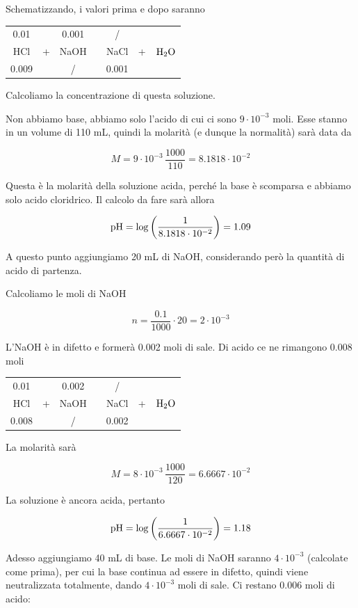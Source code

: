 Schematizzando, i valori prima e dopo saranno

\begin{center}
    \begin{tabular}{ccccccc}
        0.01 &  & 0.001 & & / & &\\
        HCl & + & NaOH & \ce{->} & NaCl & + & $\rm H_2O$\\
        0.009 &  &  / & & 0.001 & &\\
    \end{tabular}
\end{center}

Calcoliamo la concentrazione di questa soluzione.

Non abbiamo base, abbiamo solo l'acido di cui ci sono $9 \cdot 10^{-3}$ moli. Esse stanno in un volume di 110 mL, quindi la molarità (e dunque la normalità) sarà data da

$$M=9 \cdot 10^{-3} \, \frac{1000}{110}=8.1818 \cdot 10^{-2}$$

Questa è la molarità della soluzione acida, perché la base è scomparsa e abbiamo solo acido cloridrico. Il calcolo da fare sarà allora

$$\rm pH=\log\left( \frac{1}{8.1818 \cdot 10^{-2}} \right)=1.09$$

A questo punto aggiungiamo 20 mL di NaOH, considerando però la quantità di acido di partenza.

Calcoliamo le moli di NaOH

$$n=\frac{0.1}{1000}\cdot 20=2 \cdot 10^{-3}$$

L'NaOH è in difetto e formerà 0.002 moli di sale. Di acido ce ne rimangono 0.008 moli

\begin{center}
    \begin{tabular}{ccccccc}
        0.01 &  & 0.002 & & / & &\\
        HCl & + & NaOH & \ce{->} & NaCl & + & $\rm H_2O$\\
        0.008 &  &  / & & 0.002 & &\\
    \end{tabular}
\end{center}

La molarità sarà

$$M=8\cdot 10^{-3} \, \frac{1000}{120}=6.6667 \cdot 10^{-2}$$

La soluzione è ancora acida, pertanto

$$\rm pH=\log\left( \frac{1}{6.6667 \cdot 10^{-2}} \right)=1.18$$

Adesso aggiungiamo 40 mL di base. Le moli di NaOH saranno $4 \cdot 10^{-3}$ (calcolate come prima), per cui la base continua ad essere in difetto, quindi viene neutralizzata totalmente, dando $4 \cdot 10^{-3}$ moli di sale. Ci restano 0.006 moli di acido:


